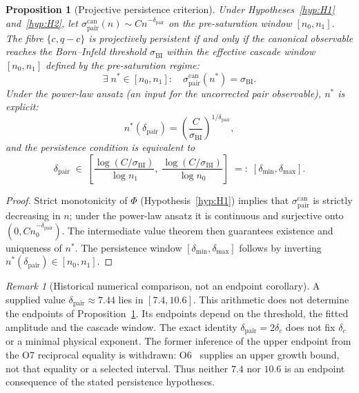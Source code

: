 \documentclass[11pt,a4paper]{article}
\newtheorem{proposition}[theorem]{Proposition}
\theoremstyle{definition}
\theoremstyle{remark}
\newtheorem{remark}[theorem]{Remark}
\begin{document}
    \begin{proposition}[Projective persistence criterion]
      \label{prop:persistence}
      Under Hypotheses~\textup{\ref{hyp:H1}}
      and~\textup{\ref{hyp:H2}}, let
      $\sigma_{\mathrm{pair}}^{\mathrm{can}}(n) \sim
      C n^{-\delta_{\mathrm{pair}}}$ on the pre-saturation window
      $[n_0, n_1]$.
      The fibre $\{c, q-c\}$ is projectively persistent if and only if
      the canonical observable reaches the Born--Infeld threshold
      $\sigma_{\mathrm{BI}}$ within the effective cascade window
      $[n_0, n_1]$ defined by the pre-saturation regime:
      \[
        \exists\; n^* \in [n_0, n_1] :
        \quad
        \sigma_{\mathrm{pair}}^{\mathrm{can}}(n^*) = \sigma_{\mathrm{BI}}.
      \]
      Under the power-law ansatz (an input for the uncorrected pair observable), $n^*$ is
      explicit:
      \[
        n^*(\delta_{\mathrm{pair}})
        = \left(\frac{C}{\sigma_{\mathrm{BI}}}\right)^{1/\delta_{\mathrm{pair}}},
      \]
      and the persistence condition is equivalent to
      \[
        \delta_{\mathrm{pair}}
        \;\in\;
        \left[
          \frac{\log(C/\sigma_{\mathrm{BI}})}{\log n_1},\;
          \frac{\log(C/\sigma_{\mathrm{BI}})}{\log n_0}
        \right]
        \;=:\; [\delta_{\min}, \delta_{\max}].
      \]
    \end{proposition}

    \begin{proof}
      Strict monotonicity of $\Phi$ (Hypothesis~\ref{hyp:H1}) implies
      that $\sigma_{\mathrm{pair}}^{\mathrm{can}}$ is strictly decreasing
      in $n$; under the power-law ansatz it is continuous and surjective
      onto $(0, C n_0^{-\delta_{\mathrm{pair}}})$.
      The intermediate value theorem then guarantees existence and
      uniqueness of $n^*$.
      The persistence window $[\delta_{\min}, \delta_{\max}]$ follows by
      inverting $n^*(\delta_{\mathrm{pair}}) \in [n_0, n_1]$.
    \end{proof}

    \begin{remark}[Historical numerical comparison, not an endpoint corollary]
      \label{cor:delta-consistency}
      A supplied value $\delta_{\mathrm{pair}}\approx7.44$ lies in $[7.4,10.6]$.
      This arithmetic does not determine the endpoints of Proposition~\ref{prop:persistence}.
      Its endpoints depend on the threshold, the fitted amplitude and the cascade window.
      The exact identity $\delta_{\mathrm{pair}}=2\delta_c$ does not fix $\delta_c$ or a minimal
      physical exponent.
      The former inference of the upper endpoint from the O7 reciprocal equality is withdrawn:
      O6~\cite{Beau2026a10} supplies an upper growth bound, not that equality or a selected interval.
      Thus neither $7.4$ nor $10.6$ is an endpoint consequence of the stated persistence hypotheses.
    \end{remark}
\end{document}
